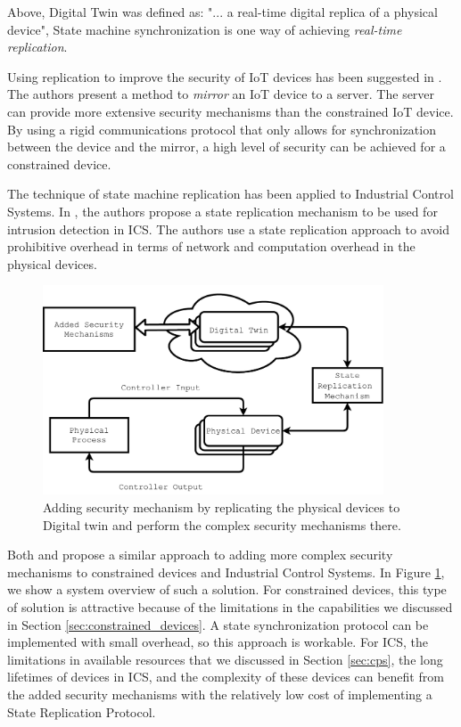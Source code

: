 Above, Digital Twin was defined as: "... a real-time digital replica of a physical device", State machine synchronization is one way of achieving \emph{real-time replication}.

Using replication to improve the security of IoT devices has been suggested in \cite{gehrmann2016iot}. The authors present a method to \emph{mirror} an IoT device to a server. The server can provide more extensive security mechanisms than the constrained IoT device. By using a rigid communications protocol that only allows for synchronization between the device and the mirror, a high level of security can be achieved for a constrained device.

The technique of state machine replication has been applied to Industrial Control Systems. In \cite{Eckhart2018}, the authors propose a state replication mechanism to be used for intrusion detection in ICS. The authors use a state replication approach to avoid prohibitive overhead in terms of network and computation overhead in the physical devices.

\begin{figure}[h]
\centering
\includegraphics[width=0.9\textwidth]{images/state_replication_security.pdf}
\caption{Adding security mechanism by replicating the physical devices to Digital twin and perform the complex security mechanisms there.}
\label{fig:state-replication-sec}
\end{figure}

Both \cite{gehrmann2016iot} and \cite{Eckhart2018} propose a similar approach to adding more complex security mechanisms to constrained devices and Industrial Control Systems. In Figure \ref{fig:state-replication-sec}, we show a system overview of such a solution. For constrained devices, this type of solution is attractive because of the limitations in the capabilities we discussed in Section \ref{sec:constrained_devices}. A state synchronization protocol can be implemented with small overhead, so this approach is workable. For ICS, the limitations in available resources that we discussed in Section \ref{sec:cps}, the long lifetimes of devices in ICS, and the complexity of these devices can benefit from the added security mechanisms with the relatively low cost of implementing a State Replication Protocol.

